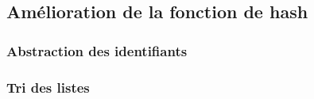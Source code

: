 
\subsection{Amélioration de la fonction de hash}

\subsubsection{Abstraction des identifiants}

\subsubsection{Tri des listes}
